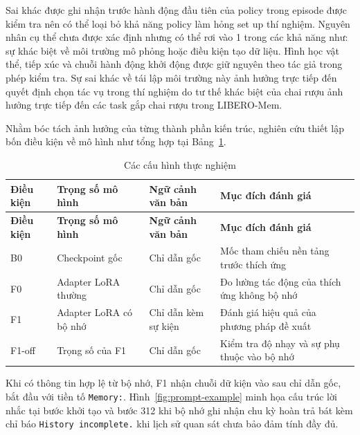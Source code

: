 Sai khác được ghi nhận trước hành động đầu tiên của policy trong episode được kiểm tra nên có thể loại bỏ khả năng policy làm hỏng set up thí nghiệm. Nguyên nhân cụ thể chưa được xác định nhưng có thể rơi vào 1 trong các khả năng như: sự khác biệt về môi trường mô phỏng hoặc điều kiện tạo dữ liệu. Hình học vật thể, tiếp xúc và chuỗi hành động khởi động được giữ nguyên theo tác giả trong phép kiểm tra. Sự sai khác về tái lập môi trường này ảnh hưởng trực tiếp đến quyết định chọn tác vụ trong thí nghiệm do tư thế khác biệt của chai rượu ảnh hưởng trực tiếp đến các task gắp chai rượu trong LIBERO-Mem. 

Nhằm bóc tách ảnh hưởng của từng thành phần kiến trúc, nghiên cứu thiết lập bốn điều kiện về mô hình như tổng hợp tại Bảng~\ref{tab:experimental-conditions}.

\begingroup\small\setlength{\tabcolsep}{4pt}\renewcommand{\arraystretch}{1.15}
\begin{longtable}{|>{\raggedright\arraybackslash}p{}|>{\raggedright\arraybackslash}p{}|>{\raggedright\arraybackslash}p{}|>{\raggedright\arraybackslash}p{}|}
\caption{Các cấu hình thực nghiệm}\label{tab:experimental-conditions}\\
\hline
\textbf{Điều kiện} & \textbf{Trọng số mô hình} & \textbf{Ngữ cảnh văn bản} & \textbf{Mục đích đánh giá} \\ \hline
\endfirsthead
\hline
\textbf{Điều kiện} & \textbf{Trọng số mô hình} & \textbf{Ngữ cảnh văn bản} & \textbf{Mục đích đánh giá} \\ \hline
\endhead
\hline\endfoot
B0 & Checkpoint gốc & Chỉ dẫn gốc & Mốc tham chiếu nền tảng trước thích ứng \\ \hline
F0 & Adapter LoRA thường & Chỉ dẫn gốc & Đo lường tác động của thích ứng không bộ nhớ \\ \hline
F1 & Adapter LoRA có bộ nhớ & Chỉ dẫn kèm sự kiện & Đánh giá hiệu quả của phương pháp đề xuất \\ \hline
F1-off & Trọng số của F1 & Chỉ dẫn gốc & Kiểm tra độ nhạy và sự phụ thuộc vào bộ nhớ \\ \hline
\end{longtable}
\endgroup

Khi có thông tin hợp lệ từ bộ nhớ, F1 nhận chuỗi dữ kiện vào sau chỉ dẫn gốc, bắt đầu với tiền tố \texttt{Memory:}. Hình~\ref{fig:prompt-example} minh họa cấu trúc lời nhắc tại bước khởi tạo và bước 312 khi bộ nhớ ghi nhận chu kỳ hoàn trả bát kèm chỉ báo \texttt{History incomplete.} khi lịch sử quan sát chưa bảo đảm tính đầy đủ.

